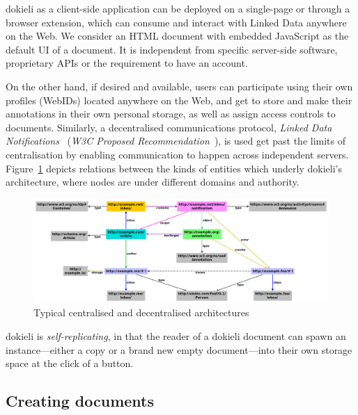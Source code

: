 \documentclass[a4paper]{llncs}
\begin{document}
\par dokieli as a client-side application can be \empty deployed on a single-page or through a browser extension, which can consume and interact with Linked Data anywhere on the Web. We consider an HTML document with embedded JavaScript as the default UI of a document. It is independent from specific server-side software, proprietary APIs or the requirement to have an account.

                                    
\par On the other hand, if desired and available, users can participate using their own profiles (WebIDs) located anywhere on the Web, and get to store and make their annotations in their own personal storage, as well as assign access controls to documents. Similarly, a decentralised communications protocol, \textit{Linked Data Notifications}~\cite{ref-9} (\textit{W3C Proposed Recommendation}~\cite{ref-10}), is used get past the limits of centralisation by enabling communication to happen across independent servers. Figure~\ref{fig:dokieli-architecture-relations} depicts relations between the kinds of entities which underly dokieli’s architecture, where nodes are under different domains and authority.

\begin{figure}
  \centering
  \includegraphics[width=\textwidth]{media/images/dokieli-architecture-relations}
  \caption{Typical centralised and decentralised architectures}
  \label{fig:dokieli-architecture-relations}
\end{figure}
                                    
\par dokieli is \textit{self-replicating}, in that the reader of a dokieli document can spawn an instance—either a copy or a brand new empty document—into their own storage space at the click of a button.

                            
                                \subsection{Creating documents}
  \label{creating-documents}
\end{document}
